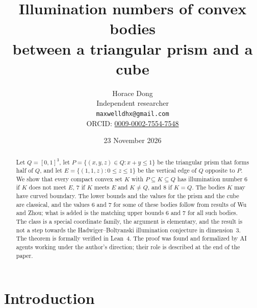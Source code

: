 \documentclass[11pt]{article}
\title{Illumination numbers of convex bodies\\ between a triangular prism and a cube}
\author{Horace Dong\\ \small Independent researcher\\
\small\texttt{maxwelldhx@gmail.com}\\
\small ORCID: \href{https://orcid.org/0009-0002-7554-7548}{0009-0002-7554-7548}}
\date{23 November 2026}
\theoremstyle{definition}
\theoremstyle{remark}
\begin{document}
\sloppy
\maketitle

\begin{abstract}
Let $Q=[0,1]^3$, let $P=\{(x,y,z)\in Q: x+y\le1\}$ be the triangular prism
that forms half of $Q$, and let $E=\{(1,1,z):0\le z\le1\}$ be the vertical
edge of $Q$ opposite to $P$. We show that every compact convex set $K$ with
$P\subseteq K\subseteq Q$ has illumination number $6$ if $K$ does not meet
$E$, $7$ if $K$ meets $E$ and $K\ne Q$, and $8$ if $K=Q$. The bodies $K$ may
have curved boundary. The lower bounds and the values for the prism and the
cube are classical, and the values $6$ and $7$ for some of these bodies follow
from results of Wu and Zhou; what is added is the matching upper bounds $6$ and $7$
for all such bodies. The class is a special coordinate family, the argument is
elementary, and the result is not a step towards the Hadwiger--Boltyanski
illumination conjecture in dimension~$3$. The theorem is formally verified in
Lean~4. The proof was found and formalized by AI agents working under the
author's direction; their role is described at the end of the paper.
\end{abstract}

\section{Introduction}\label{sec:intro}
\end{document}
